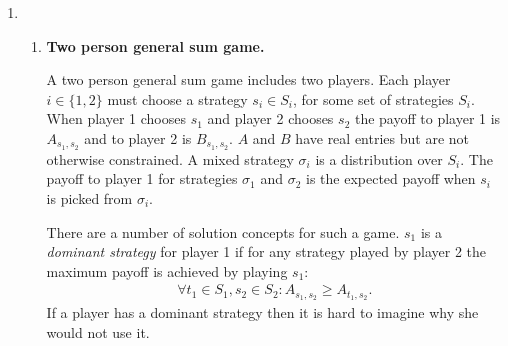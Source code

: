 \documentclass[11pt]{article} \usepackage{amssymb}
\newtheorem*{theorem*}{Theorem}
\begin{document}
\begin{enumerate}
\begin{enumerate}
\begin{enumerate}
\begin{proof}
        Let $V$ be player 1's expected payoff at this Nash. Then,
        since $G$ is a zero sum game then player 2's expected payoff
        is $-V$. Since $(S_1,S_2)$ is a Nash equilibrium then the
        expected payoff for player 1 when playing any other strategy
        is at most $V$, and the same holds for player 2 and $-V$. Thus
        $V$, $S_1$ and $S_2$ satisfy the requirements of the theorem.
      \end{proof}
    \item 
      \begin{theorem*}
        Let $G$ be a zero sum two player game with payoffs $a_{ij}$
        for strategies $1 \leq i \leq n$ and $1 \leq j \leq m$. Then
        \begin{align*}
          \max_{1 \leq i \leq n}\left\{\min_{1 \leq j \leq m}
              a_{ij}\right\}
          \leq \min_{1 \leq j \leq m}\left\{\max_{1 \leq i \leq n} a_{ij}\right\}
        \end{align*}
      \end{theorem*}
      \begin{proof}
        Denote $x_i= \min_{1 \leq j \leq m} a_{ij}$ and $y_j = \max_{1
          \leq i \leq n} a_{ij}$. For any $i$ and $j$ it holds that
        $x_i \leq a_{ij} \leq y_i$, by definition. Hence $\forall i,j$
        it holds that $x_i \leq y_j$, and in particular $\max_ix_i
        \leq min_jy_j$, which is an equivalent statement to that of
        the theorem.        
      \end{proof}
    \end{enumerate}
  \end{enumerate}
\item
  \begin{enumerate}
  \item
   {\bf Two person general sum game.}

      A two person general sum game includes two players. Each player
      $i \in \{1,2\}$ must choose a strategy $s_i \in S_i$, for some
      set of strategies $S_i$. When player 1 chooses $s_1$ and player
      2 chooses $s_2$ the payoff to player 1 is $A_{s_1,s_2}$ and to
      player 2 is $B_{s_1,s_2}$.  $A$ and $B$ have real entries but
      are not otherwise constrained. A mixed strategy $\sigma_i$ is a
      distribution over $S_i$. The payoff to player 1 for strategies
      $\sigma_1$ and $\sigma_2$ is the expected payoff when $s_i$ is
      picked from $\sigma_i$.

      There are a number of solution concepts for such a game. $s_1$
      is a {\em dominant strategy} for player 1 if for any strategy
      played by player 2 the maximum payoff is achieved by playing
      $s_1$:
      \begin{align*}        
        \forall t_1 \in S_1,s_2 \in S_2: A_{s_1,s_2} \geq A_{t_1,s_2}.
      \end{align*}
      If a player has a dominant strategy then it is hard to imagine
      why she would not use it.


\end{enumerate}
\end{enumerate}
\end{document}
